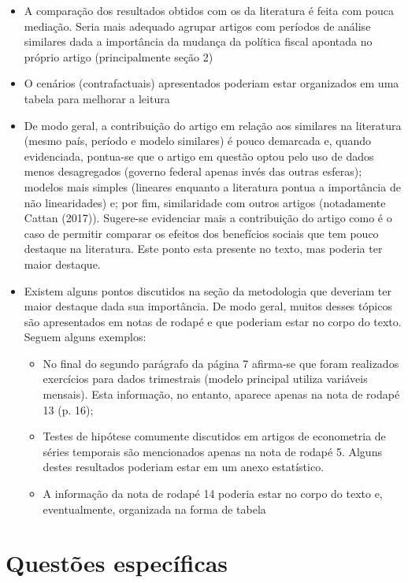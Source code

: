 \documentclass[11pt]{article}
\begin{document}
\begin{itemize}
\item A comparação dos resultados obtidos com os da literatura é feita com pouca mediação. Seria mais adequado agrupar artigos com períodos de análise similares dada a importância da mudança da política fiscal apontada no próprio artigo (principalmente seção 2)
\item O cenários (contrafactuais) apresentados poderiam estar organizados em uma tabela para melhorar a leitura
\item De modo geral, a contribuição do artigo em relação aos similares na literatura (mesmo país, período e modelo similares) é pouco demarcada e, quando evidenciada, pontua-se que o artigo em questão optou pelo uso de dados menos desagregados (governo federal apenas invés das outras esferas); modelos mais simples (lineares enquanto a literatura pontua a importância de não linearidades) e; por fim, similaridade com outros artigos (notadamente Cattan (2017)).
Sugere-se evidenciar mais a contribuição do artigo como é o caso de permitir comparar os efeitos dos benefícios sociais que tem pouco destaque na literatura. Este ponto esta presente no texto, mas poderia ter maior destaque.
\item Existem alguns pontos discutidos na seção da metodologia que deveriam ter maior destaque dada sua importância. De modo geral, muitos desses tópicos são apresentados em notas de rodapé e que poderiam estar no corpo do texto. Seguem alguns exemplos:
\begin{itemize}
\item No final do segundo parágrafo da página 7 afirma-se que foram realizados exercícios para dados trimestrais (modelo principal utiliza variáveis mensais). Esta informação, no entanto, aparece apenas na nota de rodapé 13 (p. 16);
\item Testes de hipótese comumente discutidos em artigos de econometria de séries temporais são mencionados apenas na nota de rodapé 5. Alguns destes resultados poderiam estar em um anexo estatístico.
\item A informação da nota de rodapé 14 poderia estar no corpo do texto e, eventualmente, organizada na forma de tabela
\end{itemize}
\end{itemize}

\section{Questões específicas}
\label{sec:orgfb8d9f1}
\end{document}
